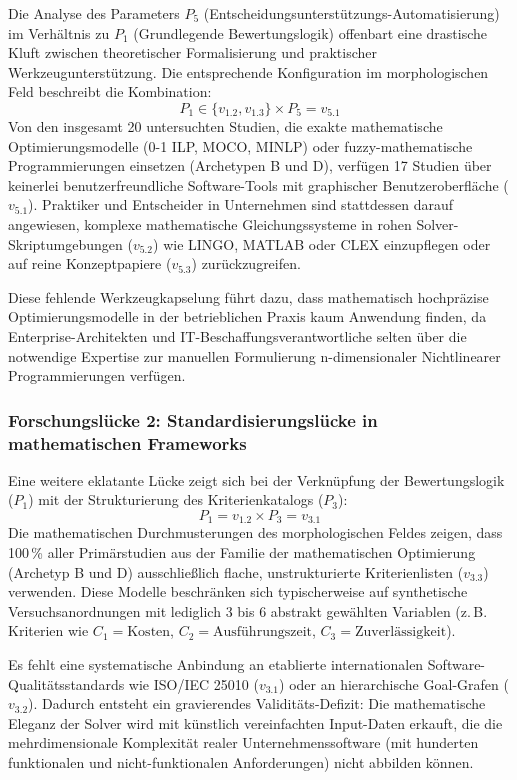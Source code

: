 Die Analyse des Parameters $P_5$ (Entscheidungsunterstützungs-Automatisierung) im Verhältnis zu $P_1$ (Grundlegende Bewertungslogik) offenbart eine drastische Kluft zwischen theoretischer Formalisierung und praktischer Werkzeugunterstützung. Die entsprechende Konfiguration im morphologischen Feld beschreibt die Kombination:
\begin{equation}
P_1 \in \{v_{1.2}, v_{1.3}\} \times P_5 = v_{5.1}
\end{equation}
Von den insgesamt 20 untersuchten Studien, die exakte mathematische Optimierungsmodelle (0-1 ILP, MOCO, MINLP) oder fuzzy-mathematische Programmierungen einsetzen (Archetypen B und D), verfügen 17 Studien über keinerlei benutzerfreundliche Software-Tools mit graphischer Benutzeroberfläche ($v_{5.1}$). Praktiker und Entscheider in Unternehmen sind stattdessen darauf angewiesen, komplexe mathematische Gleichungssysteme in rohen Solver-Skriptumgebungen ($v_{5.2}$) wie LINGO, MATLAB oder CLEX einzupflegen oder auf reine Konzeptpapiere ($v_{5.3}$) zurückzugreifen. 

Diese fehlende Werkzeugkapselung führt dazu, dass mathematisch hochpräzise Optimierungsmodelle in der betrieblichen Praxis kaum Anwendung finden, da Enterprise-Architekten und IT-Beschaffungsverantwortliche selten über die notwendige Expertise zur manuellen Formulierung n-dimensionaler Nichtlinearer Programmierungen verfügen.

\subsubsection{Forschungslücke 2: Standardisierungslücke in mathematischen Frameworks}

Eine weitere eklatante Lücke zeigt sich bei der Verknüpfung der Bewertungslogik ($P_1$) mit der Strukturierung des Kriterienkatalogs ($P_3$):
\begin{equation}
P_1 = v_{1.2} \times P_3 = v_{3.1}
\end{equation}
Die mathematischen Durchmusterungen des morphologischen Feldes zeigen, dass 100\,\% aller Primärstudien aus der Familie der mathematischen Optimierung (Archetyp B und D) ausschließlich flache, unstrukturierte Kriterienlisten ($v_{3.3}$) verwenden. Diese Modelle beschränken sich typischerweise auf synthetische Versuchsanordnungen mit lediglich 3 bis 6 abstrakt gewählten Variablen (z.\,B. Kriterien wie $C_1=\text{Kosten}$, $C_2=\text{Ausführungszeit}$, $C_3=\text{Zuverlässigkeit}$). 

Es fehlt eine systematische Anbindung an etablierte internationalen Software-Qualitätsstandards wie ISO/IEC 25010 ($v_{3.1}$) oder an hierarchische Goal-Grafen ($v_{3.2}$). Dadurch entsteht ein gravierendes Validitäts-Defizit: Die mathematische Eleganz der Solver wird mit künstlich vereinfachten Input-Daten erkauft, die die mehrdimensionale Komplexität realer Unternehmenssoftware (mit hunderten funktionalen und nicht-funktionalen Anforderungen) nicht abbilden können.

